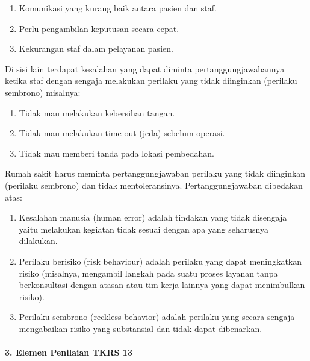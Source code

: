 \documentclass[
]{book}
\providecommand{\tightlist}{%
  \setlength{\itemsep}{0pt}\setlength{\parskip}{0pt}}
\begin{document}
\begin{enumerate}
\def\labelenumi{\alph{enumi}.}
\tightlist
\item
  Komunikasi yang kurang baik antara pasien dan staf.
\item
  Perlu pengambilan keputusan secara cepat.
\item
  Kekurangan staf dalam pelayanan pasien.
\end{enumerate}

Di sisi lain terdapat kesalahan yang dapat diminta pertanggungjawabannya ketika staf dengan sengaja melakukan perilaku yang tidak diinginkan (perilaku sembrono) misalnya:

\begin{enumerate}
\def\labelenumi{\alph{enumi}.}
\tightlist
\item
  Tidak mau melakukan kebersihan tangan.
\item
  Tidak mau melakukan time-out (jeda) sebelum operasi.
\item
  Tidak mau memberi tanda pada lokasi pembedahan.
\end{enumerate}

Rumah sakit harus meminta pertanggungjawaban perilaku yang tidak diinginkan (perilaku sembrono) dan tidak mentoleransinya. Pertanggungjawaban dibedakan atas:

\begin{enumerate}
\def\labelenumi{\alph{enumi}.}
\tightlist
\item
  Kesalahan manusia (human error) adalah tindakan yang tidak disengaja yaitu melakukan kegiatan tidak sesuai dengan apa yang seharusnya dilakukan.
\item
  Perilaku berisiko (risk behaviour) adalah perilaku yang dapat meningkatkan risiko (misalnya, mengambil langkah pada suatu proses layanan tanpa berkonsultasi dengan atasan atau tim kerja lainnya yang dapat menimbulkan risiko).
\item
  Perilaku sembrono (reckless behavior) adalah perilaku yang secara sengaja mengabaikan risiko yang substansial dan tidak dapat dibenarkan.
\end{enumerate}

\hypertarget{elemen-penilaian-tkrs-13}{%
\paragraph*{3. Elemen Penilaian TKRS 13}\label{elemen-penilaian-tkrs-13}}
\end{document}
